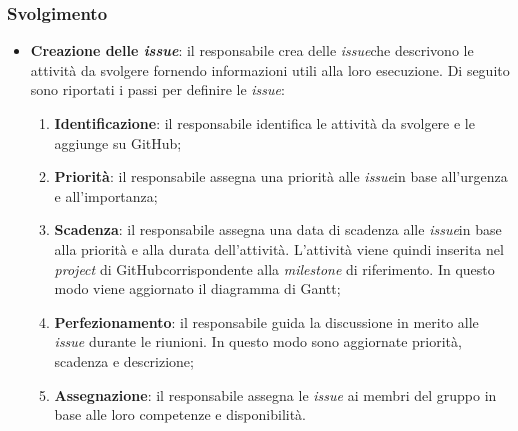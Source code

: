 \subsubsection{Svolgimento}
\begin{itemize}
	\item \textbf{Creazione delle \textit{issue\g}}: il responsabile crea
	      delle \textit{issue}\g che descrivono le attività da svolgere fornendo informazioni utili alla loro esecuzione. 
		  Di seguito sono riportati i passi per definire le \textit{issue\g}:
	      \begin{enumerate}
		      \item \textbf{Identificazione}: il responsabile identifica le
		            attività da svolgere e le aggiunge su GitHub\g;

		      \item \textbf{Priorità}: il responsabile assegna una priorità
		            alle \textit{issue}\g in base all'urgenza e all'importanza;

		      \item \textbf{Scadenza}: il responsabile assegna una data di
		            scadenza alle \textit{issue}\g in base alla priorità e alla durata
		            dell'attività. L'attività viene quindi inserita nel
		            \textit{project} di GitHub\g corrispondente alla
		            \textit{milestone} di riferimento. In questo modo viene aggiornato il
		            diagramma di Gantt;

		      \item \textbf{Perfezionamento}: il responsabile guida la
		            discussione in merito alle \textit{issue\g} durante le
		            riunioni. In questo modo sono aggiornate priorità,
		            scadenza e descrizione;

		      \item \textbf{Assegnazione}: il responsabile assegna le \textit{issue}\g
		            ai membri del gruppo in base alle loro competenze e
		            disponibilità.
	      \end{enumerate}
\end{itemize}
